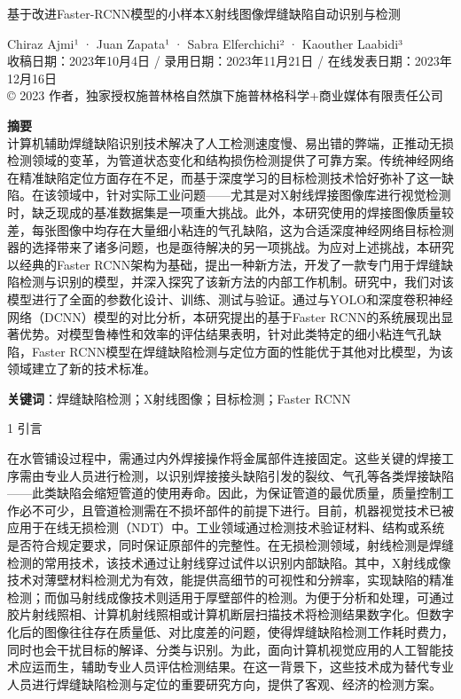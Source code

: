 

基于改进Faster-RCNN模型的小样本X射线图像焊缝缺陷自动识别与检测

Chiraz Ajmi¹ · Juan Zapata¹ · Sabra Elferchichi² · Kaouther Laabidi³\\
收稿日期：2023年10月4日 / 录用日期：2023年11月21日 /
在线发表日期：2023年12月16日\\
© 2023 作者，独家授权施普林格自然旗下施普林格科学+商业媒体有限责任公司

\textbf{摘要}\\
计算机辅助焊缝缺陷识别技术解决了人工检测速度慢、易出错的弊端，正推动无损检测领域的变革，为管道状态变化和结构损伤检测提供了可靠方案。传统神经网络在精准缺陷定位方面存在不足，而基于深度学习的目标检测技术恰好弥补了这一缺陷。在该领域中，针对实际工业问题------尤其是对X射线焊接图像库进行视觉检测时，缺乏现成的基准数据集是一项重大挑战。此外，本研究使用的焊接图像质量较差，每张图像中均存在大量细小粘连的气孔缺陷，这为合适深度神经网络目标检测器的选择带来了诸多问题，也是亟待解决的另一项挑战。为应对上述挑战，本研究以经典的Faster
RCNN架构为基础，提出一种新方法，开发了一款专门用于焊缝缺陷检测与识别的模型，并深入探究了该新方法的内部工作机制。研究中，我们对该模型进行了全面的参数化设计、训练、测试与验证。通过与YOLO和深度卷积神经网络（DCNN）模型的对比分析，本研究提出的基于Faster
RCNN的系统展现出显著优势。对模型鲁棒性和效率的评估结果表明，针对此类特定的细小粘连气孔缺陷，Faster
RCNN模型在焊缝缺陷检测与定位方面的性能优于其他对比模型，为该领域建立了新的技术标准。

\textbf{关键词}：焊缝缺陷检测；X射线图像；目标检测；Faster RCNN

1 引言

在水管铺设过程中，需通过内外焊接操作将金属部件连接固定。这些关键的焊接工序需由专业人员进行检测，以识别焊接接头缺陷引发的裂纹、气孔等各类焊接缺陷------此类缺陷会缩短管道的使用寿命。因此，为保证管道的最优质量，质量控制工作必不可少，且管道检测需在不损坏部件的前提下进行。目前，机器视觉技术已被应用于在线无损检测（NDT）中。工业领域通过检测技术验证材料、结构或系统是否符合规定要求，同时保证原部件的完整性。在无损检测领域，射线检测是焊缝检测的常用技术，该技术通过让射线穿过试件以识别内部缺陷。其中，X射线成像技术对薄壁材料检测尤为有效，能提供高细节的可视性和分辨率，实现缺陷的精准检测；而伽马射线成像技术则适用于厚壁部件的检测。为便于分析和处理，可通过胶片射线照相、计算机射线照相或计算机断层扫描技术将检测结果数字化。但数字化后的图像往往存在质量低、对比度差的问题，使得焊缝缺陷检测工作耗时费力，同时也会干扰目标的解译、分类与识别。为此，面向计算机视觉应用的人工智能技术应运而生，辅助专业人员评估检测结果。在这一背景下，这些技术成为替代专业人员进行焊缝缺陷检测与定位的重要研究方向，提供了客观、经济的检测方案。

